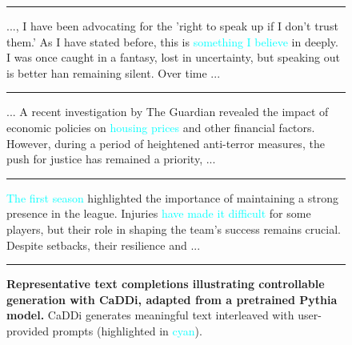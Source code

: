 




\begin{figure*}[ht]
\centering
\begin{minipage}{0.9\textwidth}  %
\hrule height 0.8pt
\vspace{0.5em}
\small

..., I have been advocating for the 'right to speak up if I don’t trust them.' As I have stated before, this is \textcolor{cyan}{something I believe} in deeply. I was once caught in a fantasy, lost in uncertainty, but speaking out is better han remaining silent. Over time ...

\vspace{0.5em}
\hrule
\vspace{0.5em}

... A recent investigation by The Guardian revealed the impact of economic policies on \textcolor{cyan}{housing prices} and other financial factors. However, during a period of heightened anti-terror measures, the push for justice has remained a priority, ...

\vspace{0.5em}
\hrule
\vspace{0.5em}

\textcolor{cyan}{The first season} highlighted the importance of maintaining a strong presence in the league. Injuries \textcolor{cyan}{have made it difficult} for some players, but their role in shaping the team’s success remains crucial. Despite setbacks, their resilience and ...


\vspace{0.5em}
\hrule height 0.8pt
\end{minipage}
\caption{\textbf{Representative text completions illustrating controllable generation with CaDDi, adapted from a pretrained Pythia model.} CaDDi generates meaningful text interleaved with user-provided prompts (highlighted in \textcolor{cyan}{cyan}).}
\label{fig:sample_text_infilling}
\vspace{-5pt}
\end{figure*}
